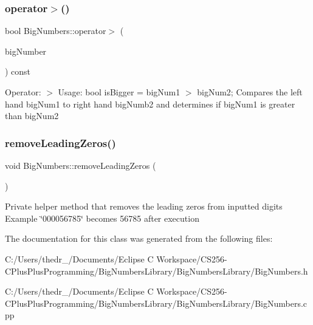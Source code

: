 \subsubsection{\texorpdfstring{operator$>$()}{operator>()}}
{\footnotesize\ttfamily bool Big\+Numbers\+::operator$>$ (\begin{DoxyParamCaption}\item[{const \mbox{\hyperlink{class_big_numbers}{Big\+Numbers}} \&}]{big\+Number }\end{DoxyParamCaption}) const}

Operator\+: $>$ Usage\+: bool is\+Bigger = big\+Num1 $>$ big\+Num2; Compares the left hand big\+Num1 to right hand big\+Numb2 and determines if big\+Num1 is greater than big\+Num2 \mbox{\label{class_big_numbers_a70e286c61489246cdfc307c2849aaaf2}} 
\subsubsection{\texorpdfstring{remove\+Leading\+Zeros()}{removeLeadingZeros()}}
{\footnotesize\ttfamily void Big\+Numbers\+::remove\+Leading\+Zeros (\begin{DoxyParamCaption}{ }\end{DoxyParamCaption})\hspace{0.3cm}{\ttfamily [private]}}

Private helper method that removes the leading zeros from inputted digits Example \char`\"{}000056785\char`\"{} becomes 56785 after execution 

The documentation for this class was generated from the following files\+:\begin{DoxyCompactItemize}
\item 
C\+:/\+Users/thedr\+\_/\+Documents/\+Eclipse C Workspace/\+C\+S256-\/\+C\+Plus\+Plus\+Programming/\+Big\+Numbers\+Library/\+Big\+Numbers\+Library/Big\+Numbers.\+h\item 
C\+:/\+Users/thedr\+\_/\+Documents/\+Eclipse C Workspace/\+C\+S256-\/\+C\+Plus\+Plus\+Programming/\+Big\+Numbers\+Library/\+Big\+Numbers\+Library/Big\+Numbers.\+cpp\end{DoxyCompactItemize}
